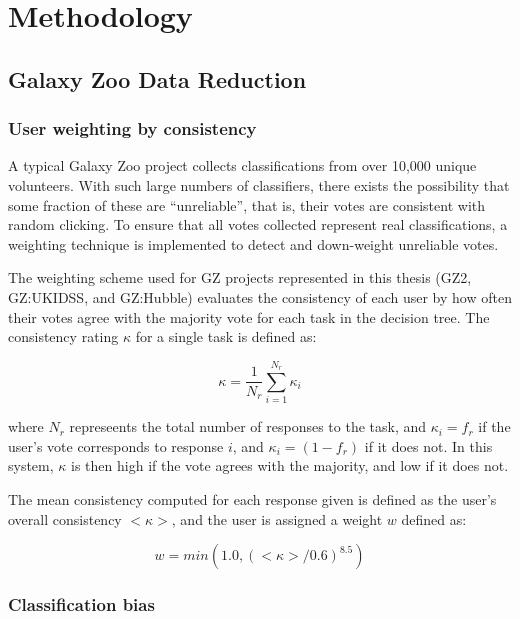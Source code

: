 \chapter{Methodology}
\label{chap:methodology}


\section{Galaxy Zoo Data Reduction}
\subsection{User weighting by consistency}
A typical Galaxy Zoo project collects classifications from over 10,000 unique volunteers. With such large numbers of classifiers, there exists the possibility that some fraction of these are ``unreliable'', that is, their votes are consistent with random clicking. To ensure that all votes collected represent real classifications, a weighting technique is implemented to detect and down-weight unreliable votes.

The weighting scheme used for GZ projects represented in this thesis (GZ2, GZ:UKIDSS, and GZ:Hubble) evaluates the consistency of each user by how often their votes agree with the majority vote for each task in the decision tree. The consistency rating $\kappa$ for a single task is defined as:

\begin{equation}
\kappa = \frac{1}{N_{r}}\sum_{i=1}^{N_{r}}{\kappa_{i}}
\label{eqn:kappa}
\end{equation}

where $N_{r}$ represeents the total number of responses to the task, and $\kappa_{i} = f_{r}$ if the user's vote corresponds to response $i$, and $\kappa_{i} = (1-f_{r})$ if it does not. In this system, $\kappa$ is then high if the vote agrees with the majority, and low if it does not. 

The mean consistency computed for each response given is defined as the user's overall consistency $<\kappa>$, and the user is assigned a weight $w$ defined as:

\begin{equation}
w = min (1.0,(<\kappa>/0.6)^{8.5})
\label{eqn:weight}
\end{equation}
 





\subsection{Classification bias}







